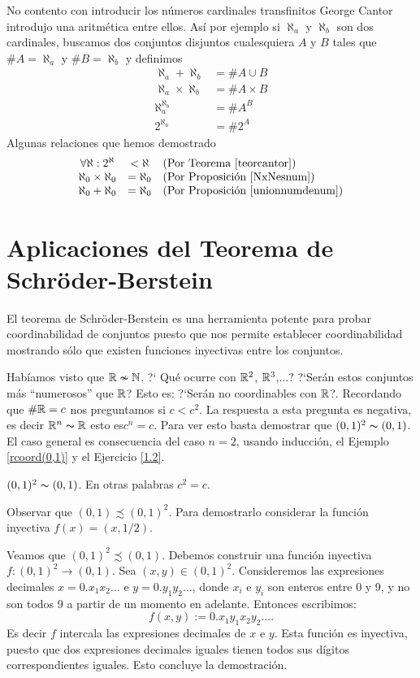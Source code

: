 No contento con introducir los números cardinales transfinitos George Cantor introdujo una aritmética entre ellos. Así por ejemplo si $\aleph_a$ y $\aleph_b$ son dos cardinales, buscamos dos conjuntos disjuntos cualesquiera $A$ y $B$ tales que $\#A=\aleph_a$ y $\#B=\aleph_b$ y definimos
\[
 \begin{split}
  \aleph_a+\aleph_b&=\#A\cup B\\
\aleph_a\times\aleph_b&=\#A\times B\\
\aleph_a^{\aleph_b}&=\#A^B\\
2^{\aleph_a}&=\#2^A
 \end{split}
\]
Algunas relaciones que hemos demostrado
\[
 \begin{array}{ccl}
  \forall \aleph: 2^\aleph &< \aleph & \text{(Por Teorema \ref{teorcantor})}\\  
   \aleph_0\times\aleph_0&=\aleph_0 &\text{(Por Proposición \ref{NxNesnum})}\\
   \aleph_0+\aleph_0&=\aleph_0 &\text{(Por Proposición \ref{unionnumdenum})}\\
   
 \end{array}
\]



\section{Aplicaciones del Teorema de Schr\"oder-Berstein}

El teorema de Schr\"oder-Berstein es una herramienta potente para
probar coordinabilidad de conjuntos puesto que nos permite establecer coordinabilidad mostrando sólo que existen funciones inyectivas entre los conjuntos.

Habíamos visto
que $\mathbb{R}\nsim\mathbb{N}$. ?` Qué ocurre con $\mathbb{R}^2$, $\mathbb{R}^3$,...?
?`Serán estos conjuntos más ``numerosos'' que $\mathbb{R}$? Esto es:
?`Serán no coordinables con $\mathbb{R}$?. Recordando que $\#\mathbb{R}=c$ nos preguntamos si $c<c^2$. La respuesta a esta
pregunta es negativa, es decir $\mathbb{R}^n\thicksim\mathbb{R}$ esto es$c^n=c$. Para ver esto
basta demostrar que $(0,1)^2\thicksim (0,1)$. El caso general es
consecuencia del caso $n=2$, usando inducción, el Ejemplo
\vref{rcoord(0,1)} y el Ejercicio \vref{1.2}.

\begin{teorema} $(0,1)^2\thicksim (0,1)$. En otras palabras $c^2=c$. 
\end{teorema}
\begin{demo} Observar que $(0,1)\precsim (0,1)^2$. Para
demostrarlo considerar la función inyectiva $f(x)=(x,1/2)$.

Veamos que $(0,1)^2\precsim (0,1)$. Debemos construir una
función inyectiva $f:(0,1)^2\longrightarrow (0,1)$. Sea
$(x,y)\in (0,1)^2$. Consideremos las expresiones decimales
$x=0.x_1x_2...$ e $y=0.y_1y_2...$, donde $x_i$ e $y_i$ son enteros
entre 0 y 9, y no son todos 9 a partir de un momento en adelante.
Entonces escribimos:
\[f(x,y):=0.x_1y_1x_2y_2....\]
Es decir $f$ intercala las expresiones decimales de $x$ e $y$.
Esta función es inyectiva, puesto que dos expresiones decimales
iguales tienen todos sus dígitos correspondientes iguales.
Esto concluye la demostración.
\end{demo}

